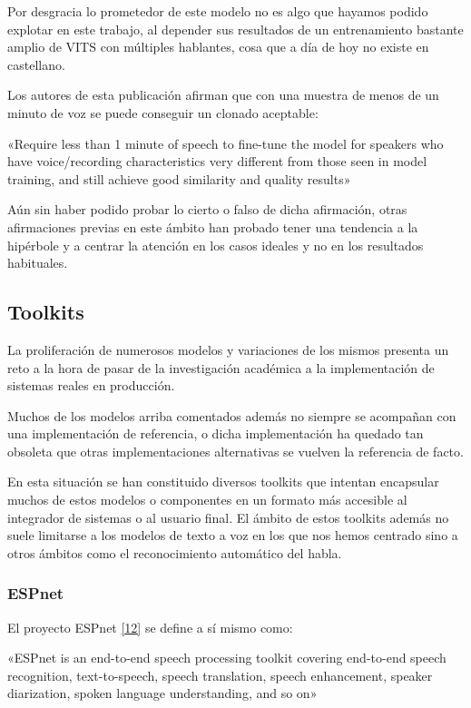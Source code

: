 Por desgracia lo prometedor de este modelo no es algo que hayamos podido explotar en este trabajo, al depender sus resultados de un entrenamiento bastante amplio de VITS con múltiples hablantes, cosa que a día de hoy no existe en castellano.

Los autores de esta publicación afirman que con una muestra de menos de un minuto de voz se puede conseguir un clonado aceptable:

\begin{displayquote}
«Require less than 1 minute of speech to fine-tune the model for speakers who have voice/recording characteristics very different from those seen in model training, and still achieve good similarity and quality results»
\end{displayquote}

Aún sin haber podido probar lo cierto o falso de dicha afirmación, otras afirmaciones previas en este ámbito han probado tener una tendencia a la hipérbole y a centrar la atención en los casos ideales y no en los resultados habituales.

\subsection{Toolkits}

La proliferación de numerosos modelos y variaciones de los mismos presenta un reto a la hora de pasar de la investigación académica a la implementación de sistemas reales en producción. 

Muchos de los modelos arriba comentados además no siempre se acompañan con una implementación de referencia, o dicha implementación ha quedado tan obsoleta que otras implementaciones alternativas se vuelven la referencia de facto.

En esta situación se han constituido diversos toolkits que intentan encapsular muchos de estos modelos o componentes en un formato más accesible al integrador de sistemas o al usuario final. El ámbito de estos toolkits además no suele limitarse a los modelos de texto a voz en los que nos hemos centrado sino a otros ámbitos como el reconocimiento automático del habla.

\subsubsection{ESPnet}

El proyecto ESPnet  \hyperref[EA_2]{[12]} se define a sí mismo como:

\begin{displayquote}
«ESPnet is an end-to-end speech processing toolkit covering end-to-end speech recognition, text-to-speech, speech translation, speech enhancement, speaker diarization, spoken language understanding, and so on»
\end{displayquote}


